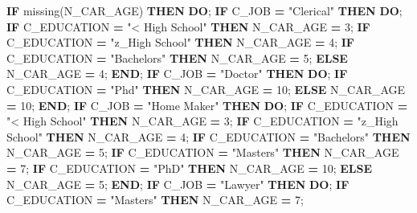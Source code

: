 \documentclass[]{article}
\newenvironment{Shaded}{\begin{snugshade}}{\end{snugshade}}
\newcommand{\KeywordTok}[1]{\textcolor[rgb]{0.13,0.29,0.53}{\textbf{{#1}}}}
\newcommand{\DecValTok}[1]{\textcolor[rgb]{0.00,0.00,0.81}{{#1}}}
\newcommand{\StringTok}[1]{\textcolor[rgb]{0.31,0.60,0.02}{{#1}}}
\newcommand{\NormalTok}[1]{{#1}}
\begin{document}
\begin{Shaded}
\begin{Highlighting}[]
    
    \KeywordTok{IF} \NormalTok{missing(N_CAR_AGE) }\KeywordTok{THEN} \KeywordTok{DO}\NormalTok{;}
        \KeywordTok{IF} \NormalTok{C_JOB }\KeywordTok{=} \StringTok{"Clerical"} \KeywordTok{THEN} \KeywordTok{DO}\NormalTok{;}
            \KeywordTok{IF} \NormalTok{C_EDUCATION }\KeywordTok{=} \StringTok{"< High School"} \KeywordTok{THEN} \NormalTok{N_CAR_AGE }\KeywordTok{=} \DecValTok{3}\NormalTok{;}
            \KeywordTok{IF} \NormalTok{C_EDUCATION }\KeywordTok{=} \StringTok{"z_High School"} \KeywordTok{THEN} \NormalTok{N_CAR_AGE }\KeywordTok{=} \DecValTok{4}\NormalTok{;}
            \KeywordTok{IF} \NormalTok{C_EDUCATION }\KeywordTok{=} \StringTok{"Bachelors"} \KeywordTok{THEN} \NormalTok{N_CAR_AGE }\KeywordTok{=} \DecValTok{5}\NormalTok{;}
            \KeywordTok{ELSE} \NormalTok{N_CAR_AGE }\KeywordTok{=} \DecValTok{4}\NormalTok{;}
        \KeywordTok{END}\NormalTok{;}
        \KeywordTok{IF} \NormalTok{C_JOB }\KeywordTok{=} \StringTok{"Doctor"} \KeywordTok{THEN} \KeywordTok{DO}\NormalTok{;}
            \KeywordTok{IF} \NormalTok{C_EDUCATION }\KeywordTok{=} \StringTok{"Phd"} \KeywordTok{THEN} \NormalTok{N_CAR_AGE }\KeywordTok{=} \DecValTok{10}\NormalTok{;}
            \KeywordTok{ELSE} \NormalTok{N_CAR_AGE }\KeywordTok{=} \DecValTok{10}\NormalTok{;}
        \KeywordTok{END}\NormalTok{;}
        \KeywordTok{IF} \NormalTok{C_JOB }\KeywordTok{=} \StringTok{"Home Maker"} \KeywordTok{THEN} \KeywordTok{DO}\NormalTok{;}
            \KeywordTok{IF} \NormalTok{C_EDUCATION }\KeywordTok{=} \StringTok{"< High School"} \KeywordTok{THEN} \NormalTok{N_CAR_AGE }\KeywordTok{=} \DecValTok{3}\NormalTok{;}
            \KeywordTok{IF} \NormalTok{C_EDUCATION }\KeywordTok{=} \StringTok{"z_High School"} \KeywordTok{THEN} \NormalTok{N_CAR_AGE }\KeywordTok{=} \DecValTok{4}\NormalTok{;}
            \KeywordTok{IF} \NormalTok{C_EDUCATION }\KeywordTok{=} \StringTok{"Bachelors"} \KeywordTok{THEN} \NormalTok{N_CAR_AGE }\KeywordTok{=} \DecValTok{5}\NormalTok{;}
            \KeywordTok{IF} \NormalTok{C_EDUCATION }\KeywordTok{=} \StringTok{"Masters"} \KeywordTok{THEN} \NormalTok{N_CAR_AGE }\KeywordTok{=} \DecValTok{7}\NormalTok{;}
            \KeywordTok{IF} \NormalTok{C_EDUCATION }\KeywordTok{=} \StringTok{"PhD"} \KeywordTok{THEN} \NormalTok{N_CAR_AGE }\KeywordTok{=} \DecValTok{10}\NormalTok{;}
            \KeywordTok{ELSE} \NormalTok{N_CAR_AGE }\KeywordTok{=} \DecValTok{5}\NormalTok{;}
        \KeywordTok{END}\NormalTok{;}
        \KeywordTok{IF} \NormalTok{C_JOB }\KeywordTok{=} \StringTok{"Lawyer"} \KeywordTok{THEN} \KeywordTok{DO}\NormalTok{;}
            \KeywordTok{IF} \NormalTok{C_EDUCATION }\KeywordTok{=} \StringTok{"Masters"} \KeywordTok{THEN} \NormalTok{N_CAR_AGE }\KeywordTok{=} \DecValTok{7}\NormalTok{;}

\end{Highlighting}
\end{Shaded}
\end{document}
